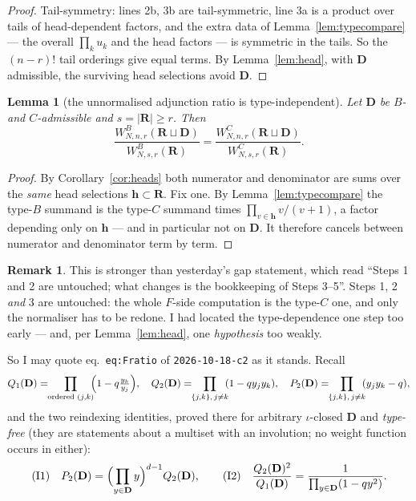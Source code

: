 \documentclass[11pt]{article}
\newtheorem{lem}[thm]{Lemma}
\theoremstyle{definition}
\newtheorem{rem}[thm]{Remark}
\newcommand{\bD}{\mathbf{D}}
\newcommand{\bR}{\mathbf{R}}
\newcommand{\bh}{\mathbf{h}}
\begin{document}
\begin{proof}
Tail-symmetry: lines 2b, 3b are tail-symmetric, line 3a is a product over tails
of head-dependent factors, and the extra data of Lemma~\ref{lem:typecompare}
--- the overall $\prod_k u_k$ and the head factors --- is symmetric in the tails.
So the $(n-r)!$ tail orderings give equal terms.  By Lemma~\ref{lem:head}, with
$\bD$ admissible, the surviving head selections avoid $\bD$.
\end{proof}

\begin{lem}[the unnormalised adjunction ratio is type-independent]
\label{lem:typeindep}
Let $\bD$ be $B$- and $C$-admissible and $s=|\bR|\ge r$.  Then
\[
  \frac{W^{B}_{N,n,r}(\bR\sqcup\bD)}{W^{B}_{N,s,r}(\bR)}
  =\frac{W^{C}_{N,n,r}(\bR\sqcup\bD)}{W^{C}_{N,s,r}(\bR)} .
\]
\end{lem}

\begin{proof}
By Corollary~\ref{cor:heads} both numerator and denominator are sums over the
\emph{same} head selections $\bh\subset\bR$.  Fix one.  By
Lemma~\ref{lem:typecompare} the type-$B$ summand is the type-$C$ summand times
$\prod_{v\in\bh}v/(v+1)$, a factor depending only on $\bh$ --- and in particular
not on $\bD$.  It therefore cancels between numerator and denominator term by
term.
\end{proof}

\begin{rem}
This is stronger than yesterday's gap statement, which read ``Steps 1 and 2 are
untouched; what changes is the bookkeeping of Steps 3--5''.  Steps 1, 2
\emph{and} 3 are untouched: the whole $F$-side computation is the type-$C$ one,
and only the normaliser has to be redone.  I had located the type-dependence one
step too early --- and, per Lemma~\ref{lem:head}, one \emph{hypothesis} too
weakly.
\end{rem}

\noindent
So I may quote eq.~\texttt{eq:Fratio} of \texttt{2026-10-18-c2} as it stands.
Recall
\[
  Q_1(\bD)=\!\!\prod_{\text{ordered }(j,k)}\!\!\Bigl(1-q\tfrac{y_k}{y_j}\Bigr),\quad
  Q_2(\bD)=\!\!\prod_{\{j,k\},\,j\ne k}\!\!(1-qy_jy_k),\quad
  P_2(\bD)=\!\!\prod_{\{j,k\},\,j\ne k}\!\!(y_jy_k-q),
\]
and the two reindexing identities, proved there for arbitrary $\iota$-closed
$\bD$ and \emph{type-free} (they are statements about a multiset with an
involution; no weight function occurs in either):
\begin{equation}\label{eq:I1I2}
  \text{(I1)}\quad P_2(\bD)=\Bigl(\prod_{y\in\bD}y\Bigr)^{d-1}Q_2(\bD),
  \qquad
  \text{(I2)}\quad \frac{Q_2(\bD)^{2}}{Q_1(\bD)}=\frac{1}{\prod_{y\in\bD}(1-qy^{2})} .
\end{equation}
\end{document}
